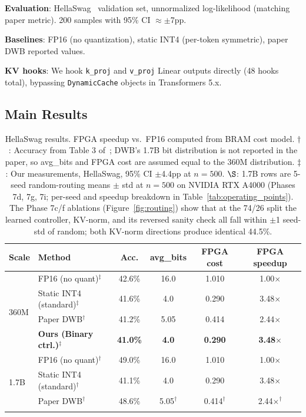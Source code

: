 \documentclass{article}
\begin{document}
\textbf{Evaluation}: HellaSwag~\citep{zellers2019hellaswag} validation set, unnormalized log-likelihood (matching paper metric). 200 samples with 95\% CI $\approx \pm$7pp.

\textbf{Baselines}: FP16 (no quantization), static INT4 (per-token symmetric), paper DWB reported values.

\textbf{KV hooks}: We hook \texttt{k\_proj} and \texttt{v\_proj} Linear outputs directly (48 hooks total), bypassing \texttt{DynamicCache} objects in Transformers 5.x.

\subsection{Main Results}

\begin{table}[h]
\centering
\caption{HellaSwag results. FPGA speedup vs.\ FP16 computed from BRAM cost model. $\dagger$: Accuracy from Table 3 of~\cite{haeri2026dwb}; DWB's 1.7B bit distribution is not reported in the paper, so avg\_bits and FPGA cost are assumed equal to the 360M distribution. $\ddagger$: Our measurements, HellaSwag, 95\% CI $\pm$4.4pp at $n{=}500$. $\S$: 1.7B rows are 5-seed random-routing means $\pm$ std at $n{=}500$ on NVIDIA RTX A4000 (Phases 7d, 7g, 7i; per-seed and speedup breakdown in Table~\ref{tab:operating_points}). The Phase 7c/f ablations (Figure~\ref{fig:routing}) show that at the 74/26 split the learned controller, KV-norm, and its reversed sanity check all fall within $\pm$1 seed-std of random; both KV-norm directions produce identical 44.5\%.}
\begin{tabular}{llcccc}
\toprule
Scale & Method & Acc. & avg\_bits & FPGA cost & FPGA speedup \\
\midrule
\multirow{4}{*}{360M} & FP16 (no quant)$^\ddagger$ & 42.6\% & 16.0 & 1.010 & 1.00$\times$ \\
 & Static INT4 (standard)$^\ddagger$ & 41.6\% & 4.0 & 0.290 & 3.48$\times$ \\
 & Paper DWB$^\dagger$ & 41.2\% & 5.05 & 0.414 & 2.44$\times$ \\
 & \textbf{Ours (Binary ctrl.)}$^\ddagger$ & \textbf{41.0\%} & \textbf{4.0} & \textbf{0.290} & \textbf{3.48}$\times$ \\
\midrule
\multirow{6}{*}{1.7B} & FP16 (no quant)$^\dagger$ & 49.0\% & 16.0 & 1.010 & 1.00$\times$ \\
 & Static INT4 (standard)$^\dagger$ & 41.1\% & 4.0 & 0.290 & 3.48$\times$ \\
 & Paper DWB$^\dagger$ & 48.6\% & 5.05$^\dagger$ & 0.414$^\dagger$ & 2.44$\times$$^\dagger$ \\
$$
\end{tabular}
\end{table}
\end{document}
